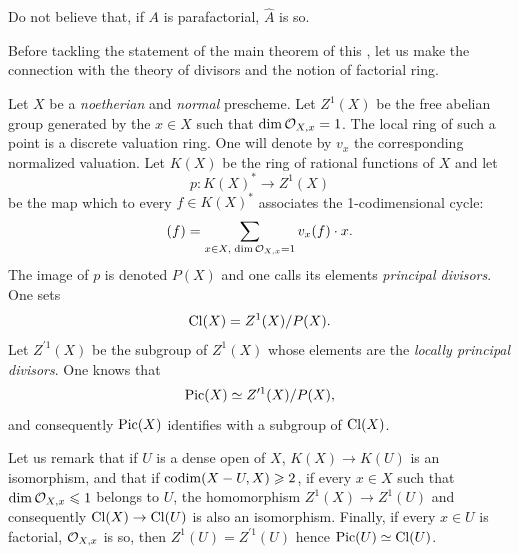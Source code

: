 Do not believe that, if $A$ is parafactorial, $\hat A$ is so.

Before tackling the statement of the main theorem of this \no, let us make the connection with the theory of divisors and the notion of factorial ring.

Let $X$ be a \emph{noetherian} and \emph{normal} prescheme. Let $Z^1(X)$ be the free abelian group generated by the $x\in X$ such that $\dim\mathcal{O}_{X, x}=1$. The local ring of such a point is a discrete valuation ring. One will denote by $v_x$ the corresponding normalized valuation. Let $K(X)$ be the ring of rational functions of $X$ and let
\[
p\colon K(X)^*\to Z^1(X)
\]
be the map which to every $f\in K(X)^*$ associates the 1-codimensional cycle:
\[
(f) = \sum_{x\in X, \;\dim\mathcal{O}_{X, x}=1} v_x(f)\cdot x{}.
\]
The image of $p$ is denoted $P(X)$ and one calls its elements \emph{principal divisors}. One sets
\[
\operatorname{Cl}(X) = Z^1(X)/P(X){}.
\]
Let $Z^{\prime1}(X)$ be the subgroup of $Z^1(X)$ whose elements are the \emph{locally principal divisors}. One knows that
\[
\operatorname{Pic}(X)\simeq Z^{\prime1}(X)/P(X){},
\]
and consequently $\operatorname{Pic}(X)$ identifies with a subgroup of $\operatorname{Cl}(X)$.

Let us remark that if $U$ is a dense open of $X$, $K(X)\to K(U)$ is an isomorphism, and that if $\operatorname{codim}(X-U, X)\geqslant 2$, \ie if every $x\in X$ such that $\dim\mathcal{O}_{X, x}\leqslant 1$ belongs to $U$, the homomorphism $Z^1(X)\to Z^1(U)$ and consequently $\Cl(X)\to\Cl(U)$ is also an isomorphism. Finally, if every $x\in U$ is factorial, \ie $\mathcal{O}_{X, x}$ is so, then $Z^1(U) = Z^{\prime1}(U)$ hence $\operatorname{Pic}(U)\simeq\operatorname{Cl}(U)$.

